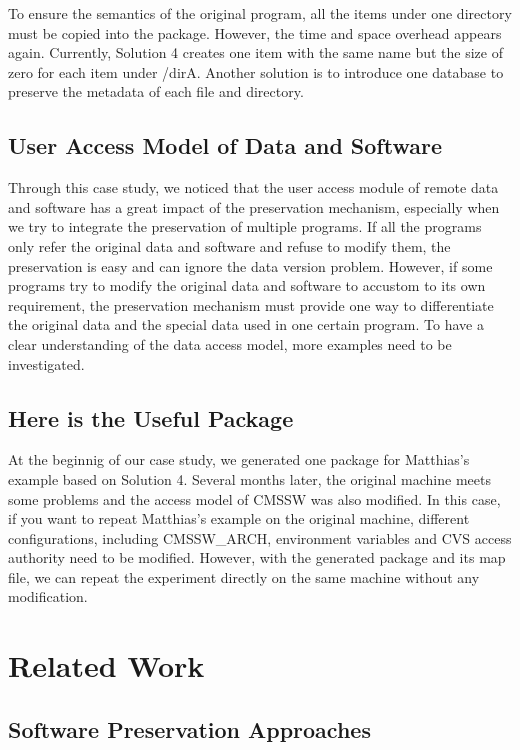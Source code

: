 \documentclass{acm_proc_article-sp}
\begin{document}
To ensure the semantics of the original program, all the items under one directory must be copied
into the package. However, the
time and space overhead appears again. Currently, Solution 4 creates one item
with the same name but the size of zero for each item under /dirA. Another
solution is to introduce one database to preserve the metadata of each file and
directory. 

\subsection{User Access Model of Data and Software}

Through this case study, we noticed that the user access module of remote data
and software has a great impact of the preservation mechanism, especially when
we try to integrate the preservation of multiple programs. If all the programs
only refer the original data and software and refuse to modify them, the
preservation is easy and can ignore the data version problem. However, if some
programs try to modify the original data and software to accustom to its own
requirement, the preservation mechanism must provide one way to differentiate
the original data and the special data used in one certain
program. To have a clear understanding of the data access model, more examples
need to be investigated.

\subsection{Here is the Useful Package}

At the beginnig of our case study, we generated one package for Matthias's
example based on Solution 4. Several months later, the original machine meets
some problems and the access model of CMSSW was also modified. In this case, if
you want to repeat Matthias's example on the original machine, different 
configurations, including CMSSW\_ARCH, environment variables and CVS access
authority need to be modified. However, with the generated package and its map file, we can repeat the experiment directly on the same machine without any modification.

\section{Related Work }
\subsection{Software Preservation Approaches}
\end{document}
